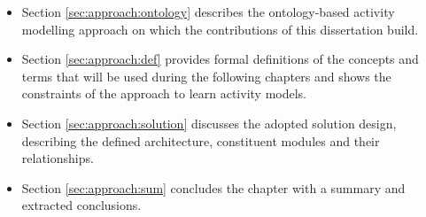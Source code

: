 \begin{itemize}
 \item Section \ref{sec:approach:ontology} describes the ontology-based activity modelling approach on which the contributions of this dissertation build. %
 \item Section \ref{sec:approach:def} provides formal definitions of the concepts and terms that will be used during the following chapters and shows the constraints of the approach to learn activity models. %
 \item Section \ref{sec:approach:solution} discusses the adopted solution design, describing the defined architecture, constituent modules and their relationships. %
 \item Section \ref{sec:approach:sum} concludes the chapter with a summary and extracted conclusions.
\end{itemize}

